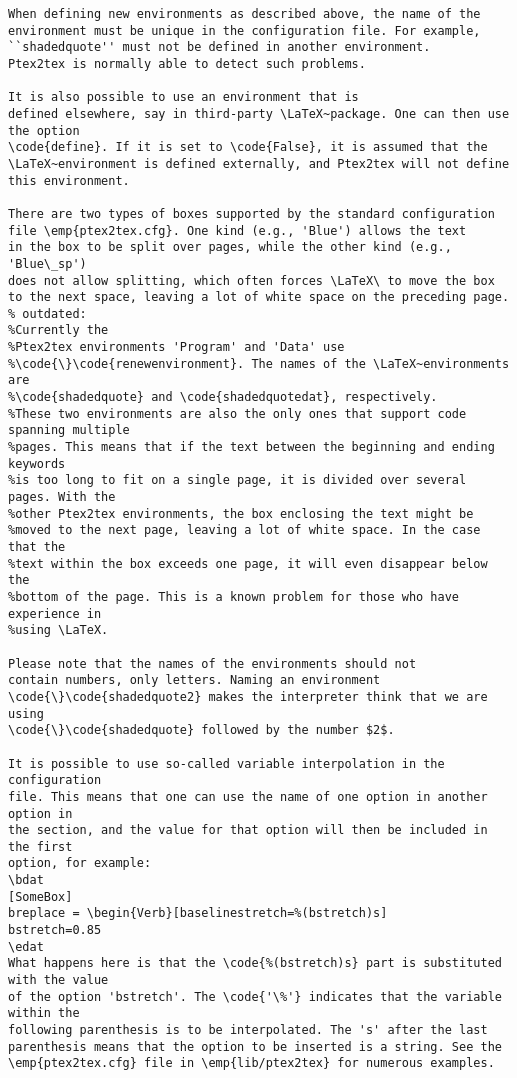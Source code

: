 \documentclass[a4paper,11pt]{article}
\begin{document}
{{{{{{{{{{{\begin{Verbatim}
When defining new environments as described above, the name of the
environment must be unique in the configuration file. For example,
``shadedquote'' must not be defined in another environment.
Ptex2tex is normally able to detect such problems.

It is also possible to use an environment that is
defined elsewhere, say in third-party \LaTeX~package. One can then use the option
\code{define}. If it is set to \code{False}, it is assumed that the
\LaTeX~environment is defined externally, and Ptex2tex will not define
this environment. 

There are two types of boxes supported by the standard configuration
file \emp{ptex2tex.cfg}. One kind (e.g., 'Blue') allows the text 
in the box to be split over pages, while the other kind (e.g., 'Blue\_sp')
does not allow splitting, which often forces \LaTeX\ to move the box
to the next space, leaving a lot of white space on the preceding page.
% outdated:
%Currently the
%Ptex2tex environments 'Program' and 'Data' use
%\code{\}\code{renewenvironment}. The names of the \LaTeX~environments are
%\code{shadedquote} and \code{shadedquotedat}, respectively.
%These two environments are also the only ones that support code spanning multiple
%pages. This means that if the text between the beginning and ending keywords
%is too long to fit on a single page, it is divided over several pages. With the
%other Ptex2tex environments, the box enclosing the text might be
%moved to the next page, leaving a lot of white space. In the case that the
%text within the box exceeds one page, it will even disappear below the
%bottom of the page. This is a known problem for those who have experience in
%using \LaTeX. 

Please note that the names of the environments should not
contain numbers, only letters. Naming an environment
\code{\}\code{shadedquote2} makes the interpreter think that we are using
\code{\}\code{shadedquote} followed by the number $2$.

It is possible to use so-called variable interpolation in the configuration
file. This means that one can use the name of one option in another option in
the section, and the value for that option will then be included in the first
option, for example:
\bdat
[SomeBox]
breplace = \begin{Verb}[baselinestretch=%(bstretch)s]
bstretch=0.85
\edat
What happens here is that the \code{%(bstretch)s} part is substituted with the value
of the option 'bstretch'. The \code{'\%'} indicates that the variable within the
following parenthesis is to be interpolated. The 's' after the last
parenthesis means that the option to be inserted is a string. See the
\emp{ptex2tex.cfg} file in \emp{lib/ptex2tex} for numerous examples.


\end{Verbatim}}}}}}}}}}}}
\end{document}
